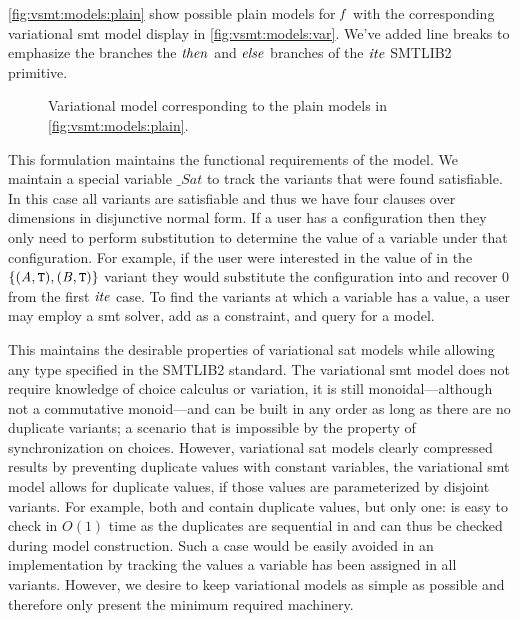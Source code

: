 \autoref{fig:vsmt:models:plain} show possible plain models for $\mathit{f}$ with the
corresponding variational \ac{smt} model display in
\autoref{fig:vsmt:models:var}. We've added line breaks to emphasize the branches
the $\mathit{then}$ and $\mathit{else}$ branches of the $\mathit{ite}$ SMTLIB2 primitive.

\begin{figure}[h]
  \centering
  
  \caption{Variational model corresponding to the plain models in
    \autoref{fig:vsmt:models:plain}.}%
  \label{fig:vsmt:models:var}
\end{figure}

This formulation maintains the functional requirements of the model. We maintain
a special variable $\_Sat$ to track the variants that were found satisfiable. In
this case all variants are satisfiable and thus we have four clauses over
dimensions in disjunctive normal form. If a user has a configuration then they
only need to perform substitution to determine the value of a variable under
that configuration. For example, if the user were interested in the value of
\iV{} in the $\{(\mathit{A}{}, \texttt{T}{}), (\mathit{B}{}, \texttt{T}{})\}$ variant they would
substitute the configuration into \vc{\iV{}} and recover 0 from the first
$\mathit{ite}$ case. To find the variants at which a variable has a value, a user
may employ a \ac{smt} solver, add \vc{\iV{}} as a constraint, and query for a
model.

This maintains the desirable properties of variational \ac{sat} models while
allowing any type specified in the SMTLIB2 standard. The variational \ac{smt}
model does not require knowledge of choice calculus or variation, it is still
monoidal---although not a commutative monoid---and can be built in any order as
long as there are no duplicate variants; a scenario that is impossible by the
property of synchronization on choices. However, variational \ac{sat} models
clearly compressed results by preventing duplicate values with constant
variables, the variational \ac{smt} model allows for duplicate values, if those
values are parameterized by disjoint variants. For example, both \iV{} and \cV{}
contain duplicate values, but only one: \iV{} is easy to check in $O(1)$ time as
the duplicates are sequential in \vc{\iV{}} and can thus be checked during model
construction. Such a case would be easily avoided in an implementation by
tracking the values a variable has been assigned in all variants. However, we
desire to keep variational models as simple as possible and therefore only
present the minimum required machinery.


